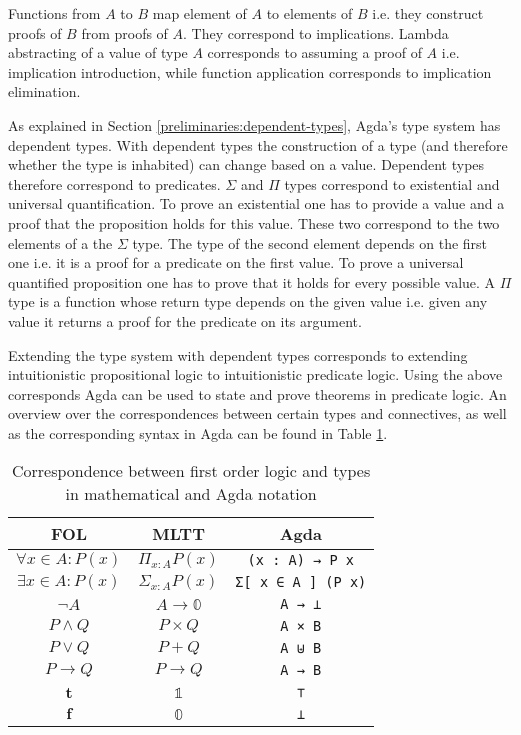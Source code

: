Functions from $A$ to $B$ map element of $A$ to elements of $B$ i.e. they
construct proofs of $B$ from proofs of $A$.
They correspond to implications.
Lambda abstracting of a value of type $A$ corresponds to assuming a proof of $A$
i.e. implication introduction, while function application corresponds to
implication elimination.

As explained in Section \ref{preliminaries:dependent-types}, Agda's type system
has dependent types.
With dependent types the construction of a type (and therefore whether the type
is inhabited) can change based on a value.
Dependent types therefore correspond to predicates.
$\Sigma$ and $\Pi$ types correspond to existential and universal quantification.
To prove an existential one has to provide a value and a proof that the
proposition holds for this value.
These two correspond to the two elements of a the $\Sigma$ type.
The type of the second element depends on the first one i.e. it is a proof for a
predicate on the first value.
To prove a universal quantified proposition one has to prove that it holds for
every possible value.
A $\Pi$ type is a function whose return type depends on the given value i.e.
given any value it returns a proof for the predicate on its argument.

Extending the type system with dependent types corresponds to extending
intuitionistic propositional logic to intuitionistic predicate logic.
Using the above corresponds Agda can be used to state and prove theorems in
predicate logic.
An overview over the correspondences between certain types and connectives, as
well as the corresponding syntax in Agda can be found in Table
\ref{preliminaries:propositions-as-types:table}.

\begin{table}
  \begin{center}
    \begin{tabular}{ccc}
      FOL & MLTT & Agda \\\hline
      $\forall x \in A: P(x)$ & $\Pi_{x:A}P(x)$ & \texttt{(x : A) → P x} \\
      $\exists x \in A: P(x)$ & $\Sigma_{x:A} P(x)$ & \texttt{Σ[ x ∈ A ] (P x)} \\
      $\neg A$ & $A \rightarrow \mathbb 0$ & \texttt{A → ⊥} \\
      $P \wedge Q$ & $P \times Q$ & \texttt{A × B} \\
      $P \vee Q$ & $P + Q$ & \texttt{A ⊎ B} \\
      $P \rightarrow Q$ & $P \rightarrow Q$ & \texttt{A → B} \\
      $\mathbf t$ & $\mathbb 1$ & \texttt{⊤} \\
      $\mathbf f$ & $\mathbb 0$ & \texttt{⊥}
    \end{tabular}
  \end{center}
  \label{preliminaries:propositions-as-types:table}
  \caption{Correspondence between first order logic and types in mathematical
    and Agda notation}
\end{table}

